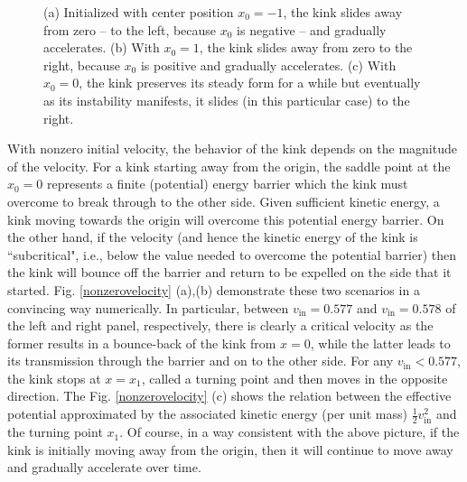 \documentclass[vecphys]{svmult}		%
\begin{document}
\begin{figure}[tbp]
\begin{center}
  \end{center}
     \caption{(a) Initialized with center position
       $x_0=-1$, the kink slides away from zero -- to the left, because $x_0$ is negative -- and gradually accelerates. (b)  With $x_0=1$, the kink slides away from zero to the right, because $x_0$ is positive and gradually accelerates. (c) With $x_0=0$, the kink preserves its steady form for a while but eventually
       as its instability manifests,
    it slides (in this particular case) to the right.}
    \label{right_left}
\end{figure}

With nonzero initial velocity, the behavior of the kink depends on the magnitude of the velocity. For a kink starting away from the origin, the saddle point
at the $x_0=0$ represents a finite (potential) energy barrier which the kink must overcome to break through to the other side.
Given sufficient kinetic energy, a kink moving towards the origin will
overcome this potential energy barrier.
On the other hand, if the velocity (and hence the kinetic energy of the kink is  ``subcritical", i.e., below the value needed to overcome the potential
barrier) then the kink will bounce off the barrier and return
to be expelled on the side that it started. Fig. \ref{nonzerovelocity} (a),(b)
demonstrate these two scenarios in a convincing way numerically.
In particular, between $v_\mathrm{in}=0.577$ and $v_\mathrm{in}=0.578$
of the left and right panel, respectively, there is clearly a critical
velocity as the former results in a bounce-back of the kink from $x=0$,
while the latter leads to its transmission through the barrier and on
to the other side.  {For any $v_\mathrm{in}<0.577$, the kink stops at $x=x_1$, called a turning point and then moves in the opposite direction. The Fig. \ref{nonzerovelocity} (c) shows the relation between the effective potential
  approximated by the associated kinetic energy
  (per unit mass) $\frac{1}{2}v_\mathrm{in}^2$ and the turning point $x_1$.  }
%
Of course, in a way consistent with the above picture,
if the kink is initially moving away from the origin, then it will continue
to move away and gradually accelerate over time. 
\end{document}
